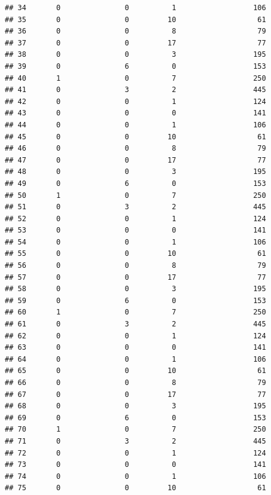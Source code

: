 \documentclass[
]{article}
\begin{document}
\begin{verbatim}
## 34       0               0          1                  106
## 35       0               0         10                   61
## 36       0               0          8                   79
## 37       0               0         17                   77
## 38       0               0          3                  195
## 39       0               6          0                  153
## 40       1               0          7                  250
## 41       0               3          2                  445
## 42       0               0          1                  124
## 43       0               0          0                  141
## 44       0               0          1                  106
## 45       0               0         10                   61
## 46       0               0          8                   79
## 47       0               0         17                   77
## 48       0               0          3                  195
## 49       0               6          0                  153
## 50       1               0          7                  250
## 51       0               3          2                  445
## 52       0               0          1                  124
## 53       0               0          0                  141
## 54       0               0          1                  106
## 55       0               0         10                   61
## 56       0               0          8                   79
## 57       0               0         17                   77
## 58       0               0          3                  195
## 59       0               6          0                  153
## 60       1               0          7                  250
## 61       0               3          2                  445
## 62       0               0          1                  124
## 63       0               0          0                  141
## 64       0               0          1                  106
## 65       0               0         10                   61
## 66       0               0          8                   79
## 67       0               0         17                   77
## 68       0               0          3                  195
## 69       0               6          0                  153
## 70       1               0          7                  250
## 71       0               3          2                  445
## 72       0               0          1                  124
## 73       0               0          0                  141
## 74       0               0          1                  106
## 75       0               0         10                   61

\end{verbatim}
\end{document}
